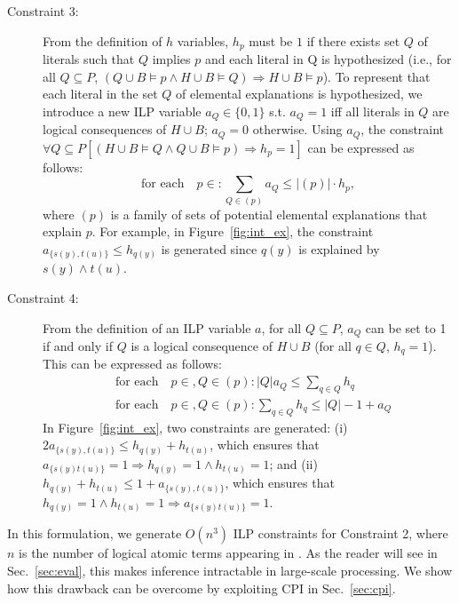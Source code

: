 \documentclass[english]{jnlp_1.4}
\def\P{}
\def\E{}
\begin{document}
\begin{description}
\item[Constraint 3:] From the definition of $h$ variables, $h_p$ must
  be $1$ if there exists set $Q$ of literals such that $Q$ implies $p$
  and each literal in Q is hypothesized (i.e., for all $Q \subseteq P$,
  $(Q \cup B \models p \land H \cup B \models Q) \Rightarrow H \cup B
  \models p$). To represent that each literal in the set $Q$ of elemental
  explanations is hypothesized, we introduce a new ILP variable $a_Q
  \in \{0,1\}$ s.t. $a_Q = 1$ iff all literals in $Q$ are logical
  consequences of $H \cup B$; $a_Q = 0$ otherwise. Using $a_Q$, the
  constraint $\forall Q \subseteq P[ (H \cup B \models Q \land Q \cup
  B \models p) \Rightarrow h_p=1]$ can be expressed as follows:
  \begin{equation}
     \text{for each}\quad p \in \P: \sum_{Q \in \E(p)} a_Q \le |\E(p)| \cdot h_p,
  \end{equation}
  where $\E(p)$ is a family of sets of potential elemental
  explanations that explain $p$.
  For example, in Figure~\ref{fig:int_ex}, the constraint
  $a_{\{s(y),t(u)\}} \le h_{q(y)}$ is generated since $q(y)$ is
  explained by $s(y) \land t(u)$.

\item[Constraint 4:] From the definition of an ILP variable $a$, for
  all $Q \subseteq P$, $a_Q$ can be set to 1 if and only if $Q$ is a
  logical consequence of $H \cup B$ (for all $q \in Q$, $h_q=1$). This
  can be expressed as follows:
  \begin{align}
    & \text{for each}\quad p \in \P, Q \in \E(p): |Q| a_Q \le \sum_{q \in Q} h_q \label{eqn:aq1} \\
    & \text{for each}\quad p \in \P, Q \in \E(p): \sum_{q \in Q} h_q \le |Q| - 1 + a_Q \label{eqn:aq2}
  \end{align}
  In Figure~\ref{fig:int_ex}, two constraints are generated: (i)
  $2a_{\{s(y),t(u)\}} \leq h_{q(y)} + h_{t(u)}$, which ensures that
  $a_{\{s(y)t(u)\}}=1 \Rightarrow h_{q(y)}=1 \land h_{t(u)}=1$; and
  (ii) $h_{q(y)} + h_{t(u)} \leq 1 + a_{\{s(y),t(u)\}}$, which ensures
  that $h_{q(y)}=1 \land h_{t(u)}=1 \Rightarrow a_{\{s(y)t(u)\}}=1$.
\end{description}


In this formulation, we generate $O(n^3)$ ILP constraints for
Constraint 2, where $n$ is the number of logical atomic terms
appearing in $\P$. As the reader will see in Sec.~\ref{sec:eval}, this
makes inference intractable in large-scale processing. We show how
this drawback can be overcome by exploiting CPI in
Sec.~\ref{sec:cpi}.
\end{document}
